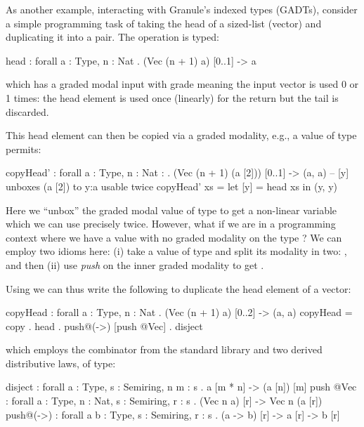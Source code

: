  As another example, interacting with Granule's indexed types
 (GADTs), consider a simple programming task of taking the head of a sized-list (vector)
 and duplicating it into a pair. The  operation
 is typed: 
\begin{granule}
head : forall { a : Type, n : Nat } 
     . (Vec (n + 1) a) [0..1] -> a
\end{granule}
 which has a graded modal input with grade  meaning
 the input vector is used 0 or 1 times:
 the head element is used once (linearly) for the return
 but the tail is discarded.
 
 This head element can then be copied via a graded
 modality, e.g., a value of type  permits:
\begin{granule}
copyHead' : forall { a : Type, n : Nat :} 
           . (Vec (n + 1) (a [2])) [0..1] -> (a, a)
-- [y] unboxes (a [2]) to y:a usable twice
copyHead' xs = let [y] = head xs in (y, y) 
\end{granule}
 Here we ``unbox'' the graded modal value of type  to
 get a non-linear variable  which we can use precisely twice.
 However, what if we are in a programming
 context where we have a value  with no
 graded modality on the type ? %
 We can employ two idioms here:
 (i) take a value of type  and
 split its modality in two: 
 , and then (ii) use \textit{push} on the inner graded modality
 \granin{[2]} to get
 .
 
 Using  we can thus write the following to duplicate
 the head element of a vector:
\begin{granule}
copyHead : forall { a : Type, n : Nat } 
         . (Vec (n + 1) a) [0..2] -> (a, a)
copyHead = copy . head . push@(->) [push @Vec] . disject
\end{granule}
 which employs the combinator  from the standard library and
 two derived distributive laws, of type:
\begin{granule}
disject   : forall { a : Type, s : Semiring, n m : s }   
          . a [m * n] -> (a [n]) [m]
push @Vec : forall { a : Type, n : Nat, s : Semiring, r : s } 
          . (Vec n a) [r] -> Vec n (a [r])
push@(->) : forall { a b : Type, s : Semiring, r : s } 
          . (a  -> b) [r] -> a [r] -> b [r]
\end{granule}

